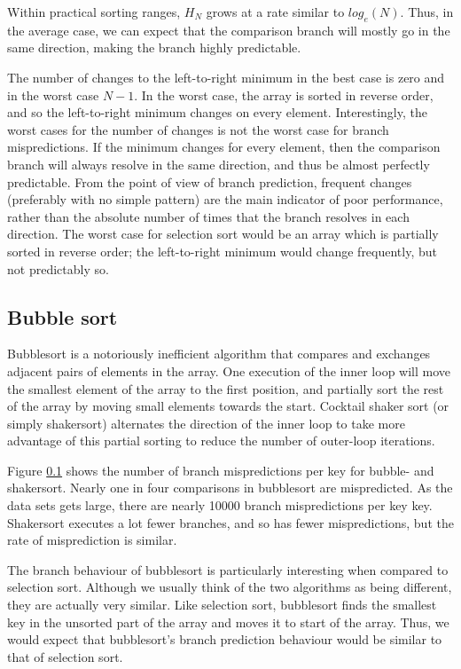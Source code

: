 \documentclass[acmtocl]{acmtrans2m}
\begin{document}
Within practical sorting ranges, $H_N$ grows at a rate similar to
$log_e(N)$. Thus, in the average case, we can expect that the comparison
branch will mostly go in the same direction, making the branch highly
predictable.

The number of changes to the left-to-right minimum in the best case is
zero and in the worst case $N-1$. In the worst case, the array is
sorted in reverse order, and so the left-to-right minimum changes on
every element. Interestingly, the worst cases for the number of
changes is not the worst case for branch mispredictions. If the
minimum changes for every element, then the comparison branch will
always resolve in the same direction, and thus be almost perfectly
predictable. From the point of view of branch prediction, frequent
changes (preferably with no simple pattern) are the main indicator of
poor performance, rather than the absolute number of times that the
branch resolves in each direction. The worst case for selection sort
would be an array which is partially sorted in reverse order; the
left-to-right minimum would change frequently, but not predictably so.

\subsection{Bubble sort}
Bubblesort is a notoriously inefficient algorithm that compares and
exchanges adjacent pairs of elements in the array. One execution of
the inner loop will move the smallest element of the array to the
first position, and partially sort the rest of the array by moving
small elements towards the start. Cocktail shaker sort (or simply
shakersort) alternates the direction of the inner loop to take
more advantage of this partial sorting to reduce the number of
outer-loop iterations.

Figure \ref{} shows the number of branch mispredictions per key for
bubble- and shakersort.  Nearly one in four comparisons in bubblesort
are mispredicted. As the data sets gets large, there are nearly 10000
branch mispredictions per key key. Shakersort executes a lot fewer
branches, and so has fewer mispredictions, but the rate of
misprediction is similar.

The branch behaviour of bubblesort is particularly interesting when
compared to selection sort. Although we usually think of the two
algorithms as being different, they are actually very similar. Like
selection sort, bubblesort finds the smallest key in the
unsorted part of the array and moves it to start of the
array. Thus, we would expect that bubblesort's branch prediction
behaviour would be similar to that of selection sort.
\end{document}
